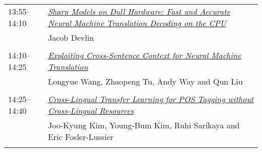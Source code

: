 \begin{tabular}{p{20mm}p{128mm}}
13:55--14:10 & \hyperlink{page.2803}{\em Sharp Models on Dull Hardware: Fast and Accurate Neural Machine Translation Decoding on the CPU}\\
         & Jacob Devlin \\
\\

14:10--14:25 & \hyperlink{page.2809}{\em Exploiting Cross-Sentence Context for Neural Machine Translation}\\
         & Longyue Wang, Zhaopeng Tu, Andy Way and Qun Liu \\
\\

14:25--14:40 & \hyperlink{page.2815}{\em Cross-Lingual Transfer Learning for POS Tagging without Cross-Lingual Resources}\\
         & Joo-Kyung Kim, Young-Bum Kim, Ruhi Sarikaya and Eric Fosler-Lussier \\
\\

\end{tabular}
\newpage
